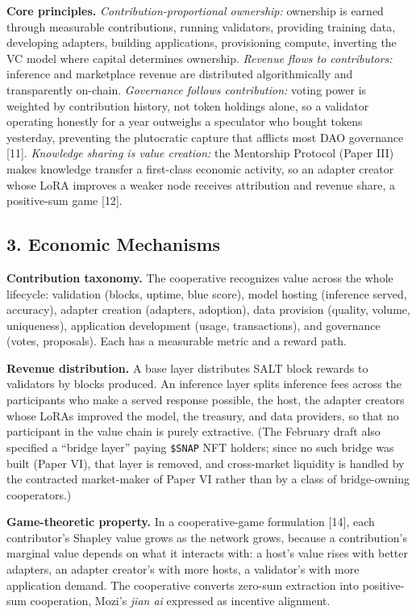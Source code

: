 \textbf{Core principles.} \emph{Contribution-proportional ownership:}
ownership is earned through measurable contributions, running
validators, providing training data, developing adapters, building
applications, provisioning compute, inverting the VC model where capital
determines ownership. \emph{Revenue flows to contributors:} inference
and marketplace revenue are distributed algorithmically and
transparently on-chain. \emph{Governance follows contribution:} voting
power is weighted by contribution history, not token holdings alone, so
a validator operating honestly for a year outweighs a speculator who
bought tokens yesterday, preventing the plutocratic capture that
afflicts most DAO governance {[}11{]}. \emph{Knowledge sharing is value
creation:} the Mentorship Protocol (Paper III) makes knowledge transfer
a first-class economic activity, so an adapter creator whose LoRA
improves a weaker node receives attribution and revenue share, a
positive-sum game {[}12{]}.

\subsection{3. Economic Mechanisms}\label{economic-mechanisms}

\textbf{Contribution taxonomy.} The cooperative recognizes value across
the whole lifecycle: validation (blocks, uptime, blue score), model
hosting (inference served, accuracy), adapter creation (adapters,
adoption), data provision (quality, volume, uniqueness), application
development (usage, transactions), and governance (votes, proposals).
Each has a measurable metric and a reward path.

\textbf{Revenue distribution.} A base layer distributes SALT block
rewards to validators by blocks produced. An inference layer splits
inference fees across the participants who make a served response
possible, the host, the adapter creators whose LoRAs improved the model,
the treasury, and data providers, so that no participant in the value
chain is purely extractive. (The February draft also specified a
``bridge layer'' paying \texttt{\$SNAP} NFT holders; since no such
bridge was built (Paper VI), that layer is removed, and cross-market
liquidity is handled by the contracted market-maker of Paper VI rather
than by a class of bridge-owning cooperators.)

\textbf{Game-theoretic property.} In a cooperative-game formulation
{[}14{]}, each contributor's Shapley value grows as the network grows,
because a contribution's marginal value depends on what it interacts
with: a host's value rises with better adapters, an adapter creator's
with more hosts, a validator's with more application demand. The
cooperative converts zero-sum extraction into positive-sum cooperation,
Mozi's \emph{jian ai} expressed as incentive alignment.

